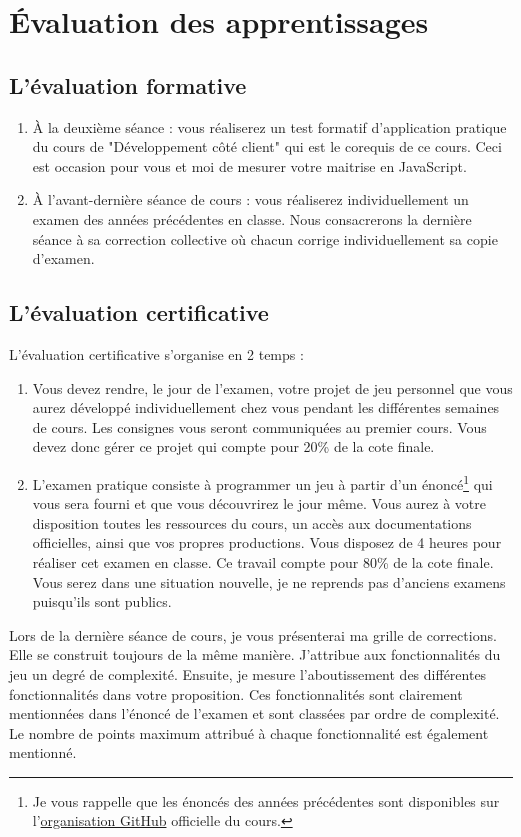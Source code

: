 \section{Évaluation des apprentissages}
\subsection{L’évaluation formative}
\label{eval_formative}
\begin{enumerate}
    \item À la deuxième séance : vous réaliserez un test formatif d’application pratique du cours de "Développement côté client" qui est le corequis de ce cours. Ceci est occasion pour vous et moi de mesurer votre maitrise en JavaScript.
    \item À l'avant-dernière séance de cours : vous réaliserez individuellement un examen des années précédentes en classe. Nous consacrerons la dernière séance à sa correction collective où chacun corrige individuellement sa copie d'examen.
\end{enumerate}

\subsection{L’évaluation certificative}

L’évaluation certificative s'organise en 2 temps :
\begin{enumerate}
    \item Vous devez rendre, le jour de l'examen, votre projet de jeu personnel que vous aurez développé individuellement chez vous pendant les différentes semaines de cours. Les consignes vous seront communiquées au premier cours. Vous devez donc gérer ce projet qui compte pour 20\% de la cote finale.
    \item L'examen pratique consiste à programmer un jeu à partir d'un énoncé\footnote{Je vous rappelle que les énoncés des années précédentes sont disponibles sur l'\href{https://github.com/tecg-mmi}{organisation GitHub} officielle du cours.} qui vous sera fourni et que vous découvrirez le jour même. Vous aurez à votre disposition toutes les ressources du cours, un accès aux documentations officielles, ainsi que vos propres productions. Vous disposez de 4 heures pour réaliser cet examen en classe. Ce travail compte pour 80\% de la cote finale. Vous serez dans une situation nouvelle, je ne reprends pas d'anciens examens puisqu'ils sont publics.
\end{enumerate}
Lors de la dernière séance de cours, je vous présenterai ma grille de corrections. Elle se construit toujours de la même manière. J'attribue aux fonctionnalités du jeu un degré de complexité. Ensuite, je mesure l'aboutissement des différentes fonctionnalités dans votre proposition. Ces fonctionnalités sont clairement mentionnées dans l'énoncé de l'examen et sont classées par ordre de complexité. Le nombre de points maximum attribué à chaque fonctionnalité est également mentionné.


